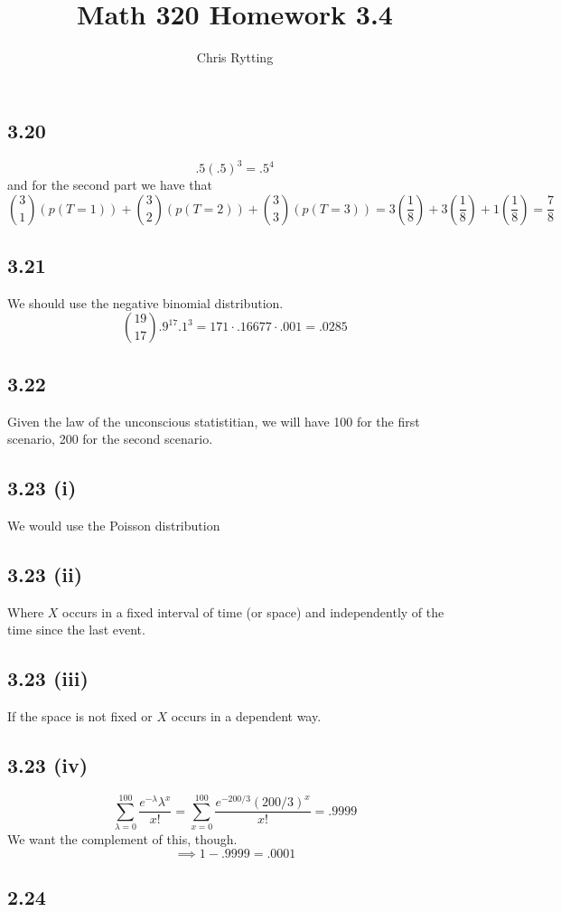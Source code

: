 \documentclass[letterpaper,12pt]{article}
\theoremstyle{definition}
\begin{document}
\title{Math 320 Homework 3.4}
\author{Chris Rytting}
\maketitle
\subsection*{3.20}
\[ .5(.5)^3 = .5^4 \]
and for the second part we have that
\[ \binom 31 (p(T=1)) + \binom 32 (p(T=2)) + \binom 33 (p(T=3)) = 3(\frac{1}{8}) + 3(\frac{1}{8}) + 1(\frac{1}{8}) = \frac{7}{8}\]
\subsection*{3.21}
We should use the negative binomial distribution.
\[ \binom {19}{17} .9^{17}.1^{3} = 171 \cdot .16677 \cdot .001 = .0285 \]
\subsection*{3.22}
Given the law of the unconscious statistitian, we will have 100 for the first scenario, 200 for the second scenario.
\subsection*{3.23 (i)}
We would use the Poisson distribution
\subsection*{3.23 (ii)}
Where $X$ occurs in a fixed interval of time (or space) and independently of the time since the last event. 
\subsection*{3.23 (iii)}
If the space is not fixed or $X$ occurs in a dependent way.
\subsection*{3.23 (iv)}
\[\sum^{100}_{\lambda = 0} \frac{e^{-\lambda} \lambda^x}{x!} = 
\sum^{100}_{x = 0} \frac{e^{-200/3} (200/3)^x}{x!} = .9999\]
We want the complement of this, though.
\[\implies 1-.9999 = .0001\] 

\subsection*{2.24}
\end{document}
